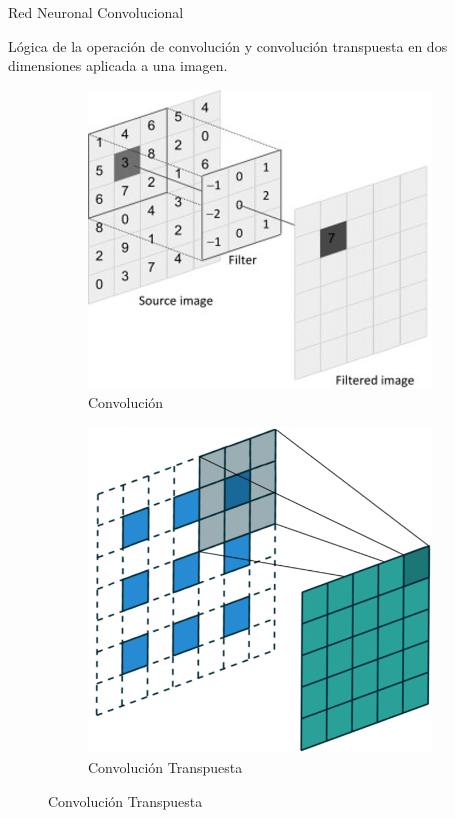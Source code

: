 \documentclass[12pt]{beamer}
\begin{document}
\begin{frame}{Red Neuronal Convolucional}

    Lógica de la operación de convolución y convolución transpuesta en dos dimensiones aplicada a una imagen.

    \begin{figure}[h]
        \begin{subfigure}{0.45\textwidth}
            \centering
            \includegraphics[scale=0.325]{figs/conv_2d.jpg}  
            \caption{Convolución}
        \end{subfigure}
        \begin{subfigure}{0.45\textwidth}
            \centering
            \includegraphics[scale=0.30]{figs/trans_conv.PNG}  
            \caption{Convolución Transpuesta}
        \end{subfigure}
    \end{figure}

\end{frame}
\end{document}
